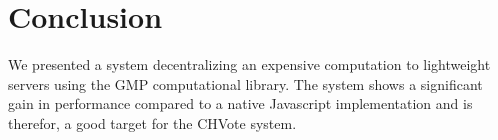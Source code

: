 \documentclass[]{article}
\begin{document}
\section{Conclusion}

We presented a system decentralizing an expensive computation to lightweight
servers using the GMP computational library. The system shows a significant gain
in performance compared to a native Javascript implementation and is therefor,
a good target for the CHVote system.




\end{document}
